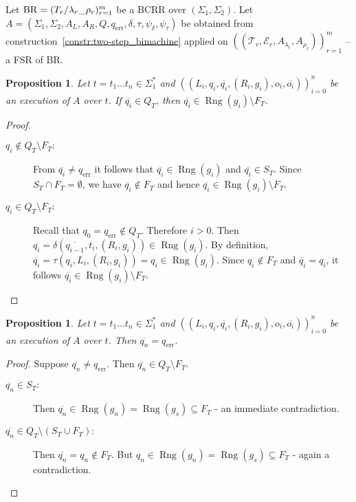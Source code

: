 \documentclass{article}
\newtheorem{proposition}[definition]{Proposition}
\DeclareMathOperator{\Rng}{Rng}
\begin{document}
	Let $\mathrm{BR}=\bcrr{m}$ be a BCRR over $(\Sigma_1, \Sigma_2)$.
	Let $A=(\Sigma_1, \Sigma_2, A_L, A_R, Q, q_\mathrm{err}, \delta, \tau, \psi_\delta, \psi_\tau)$ be obtained from construction~\ref{constr:two-step_bimachine} applied on $((\mathcal{T}_r, \mathcal{E}_r, A_{\lambda_r}, A_{\rho_r}))_{r=1}^m$ -- a FSR of $\mathrm{BR}$.

	\begin{proposition} \label{prop:execution_is_correct}
		Let $t=t_1\ldots t_n\in \Sigma_1^*$ and $((L_i, q_i, \overline{q_i}, (R_i, g_i), o_i, \overline{o_i}))_{i=0}^n$ be an execution of $A$ over $t$. If $\overline{q_i}\in Q_T$, then $\overline{q_i}\in \Rng(g_i)\setminus F_T$.
	\end{proposition}
	\begin{proof}
		\begin{description}
			\item[$q_i\notin Q_T\setminus F_T:$]
				From $\overline{q_i}\ne q_\mathrm{err}$ it follows that $\overline{q_i}\in\Rng(g_i)$ and $\overline{q_i}\in S_T$.
				Since $S_T\cap F_T = \emptyset$, we have $\overline{q_i}\notin F_T$ and hence $\overline{q_i}\in\Rng(g_i)\setminus F_T$.
			\item[$q_i\in Q_T\setminus F_T:$]
				Recall that $q_0 = q_\mathrm{err}\notin Q_T$. Therefore $i > 0$. Then $q_i = \delta(\overline{q_{i-1}}, t_i, (R_i, g_i))\in\Rng(g_i)$. By definition, $\overline{q_i} = \tau(q_i, L_i, (R_i, g_i)) = q_i\in\Rng(g_i)$. Since $q_i\notin F_T$ and $\overline{q_i} = q_i$, it follows $\overline{q_i}\in \Rng(g_i)\setminus F_T$.
		\end{description}
	\end{proof}

	\begin{proposition} \label{prop:execution_last_state}
		Let $t=t_1\ldots t_n\in \Sigma_1^*$ and $((L_i, q_i, \overline{q_i}, (R_i, g_i), o_i, \overline{o_i}))_{i=0}^n$ be an execution of $A$ over $t$. Then $\overline{q_n} = q_\mathrm{err}$.
	\end{proposition}
	\begin{proof}
		Suppose $\overline{q_n}\ne q_\mathrm{err}$. Then $\overline{q_n}\in Q_T\setminus F_T$.
		\begin{description}
			\item[$\overline{q_n}\in S_T:$]
			Then $\overline{q_n}\in \Rng(g_n) = \Rng(g_s)\subseteq F_T$ - an immediate contradiction.
			\item[$\overline{q_n}\in Q_T\setminus (S_T\cup F_T):$]
			Then $\overline{q_n} = q_n\notin F_T$. But $q_n\in \Rng(g_n) = \Rng(g_s)\subseteq F_T$ - again a contradiction.
		\end{description}
	\end{proof}
\end{document}
